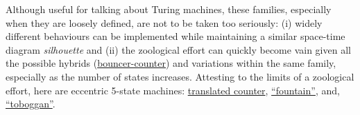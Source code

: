 \documentclass[letterpaper,british,11pt]{article}
\theoremstyle{definition} %
\numberwithin{equation}{section}
\theoremstyle{definition} %
\newcommand{\CoqBB}{Coq-BB5\xspace}
\begin{document}
Although useful for talking about Turing machines, these families, especially when they are loosely defined, are not to be taken too seriously: (i) widely different behaviours can be implemented while maintaining a similar space-time diagram \textit{silhouette} and (ii) the zoological effort can quickly become vain given all the possible hybrids (\eg \href{https://bbchallenge.org/1RB---_1LC1RE_0RD0LC_1LB1LA_0RA1RE}{bouncer-counter}) and variations within the same family, especially as the number of states increases. Attesting to the limits of a zoological effort, here are eccentric 5-state machines: \href{https://bbchallenge.org/1RB0RA_1LC0LD_1RE1RD_1LA1LB_---1RC}{translated counter}, \href{https://bbchallenge.org/1RB0RD_1LC1LB_1RA0LB_0RE1RD_---1RA}{``fountain''}, and, \href{https://bbchallenge.org/1RB0RC_0LC---_1RD1RC_0LE1RA_1RD1LE}{``toboggan''}.







\appendix
{}
\newpage





\end{document}

